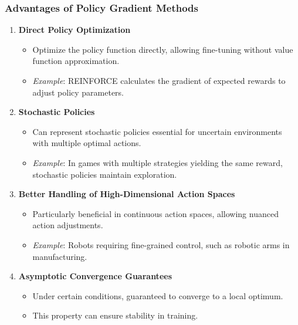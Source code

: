 \documentclass{beamer}
\begin{document}
\begin{frame}[fragile]
    \frametitle{Advantages of Policy Gradient Methods}
    \begin{enumerate}
        \item \textbf{Direct Policy Optimization}
        \begin{itemize}
            \item Optimize the policy function directly, allowing fine-tuning without value function approximation.
            \item \textit{Example}: REINFORCE calculates the gradient of expected rewards to adjust policy parameters.
        \end{itemize}

        \item \textbf{Stochastic Policies}
        \begin{itemize}
            \item Can represent stochastic policies essential for uncertain environments with multiple optimal actions.
            \item \textit{Example}: In games with multiple strategies yielding the same reward, stochastic policies maintain exploration.
        \end{itemize}

        \item \textbf{Better Handling of High-Dimensional Action Spaces}
        \begin{itemize}
            \item Particularly beneficial in continuous action spaces, allowing nuanced action adjustments.
            \item \textit{Example}: Robots requiring fine-grained control, such as robotic arms in manufacturing.
        \end{itemize}

        \item \textbf{Asymptotic Convergence Guarantees}
        \begin{itemize}
            \item Under certain conditions, guaranteed to converge to a local optimum.
            \item This property can ensure stability in training.
        \end{itemize}
    \end{enumerate}
\end{frame}
\end{document}
